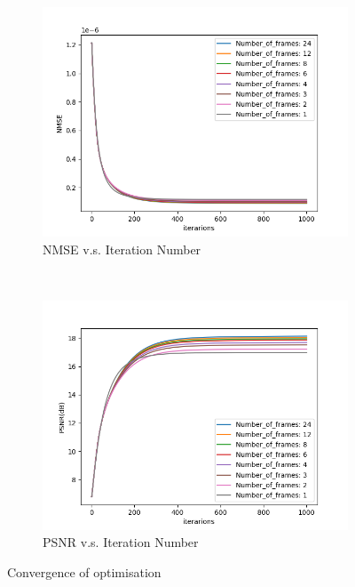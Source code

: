 	\begin{figure}[H]
		\centering
		\begin{subfigure}[t]{0.7\textwidth}
			\centering
			\includegraphics[width=1.0\textwidth]{Mandrill_NMSE_vs_iter.png}
			\caption{NMSE v.s. Iteration Number}
			\label{fig:Mandrill_NMSE_vs_iter}
		\end{subfigure}
		\\
		\begin{subfigure}[t]{0.7\textwidth}
			\centering
			\includegraphics[width=1.0\textwidth]{Mandrill_PSNR_vs_iter.png}
			\caption{PSNR v.s. Iteration Number}
			\label{fig:Mandrill_PSNR_vs_iter}
		\end{subfigure}
		\caption{Convergence of optimisation}
		\label{fig:Convergence of optimisation}
	\end{figure}

